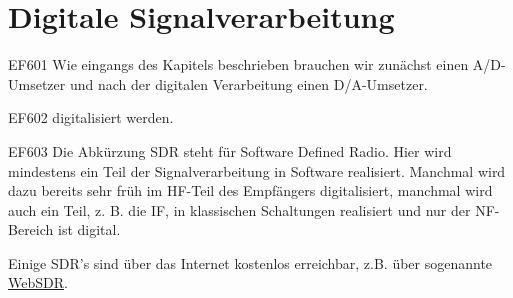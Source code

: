 \setcounter{section}{12}
\section{Digitale Signalverarbeitung}
\setcounter{subsection}{1}

\begin{sol}{EF601}
Wie eingangs des Kapitels beschrieben brauchen wir zunächst einen A/D-Umsetzer und nach der digitalen Verarbeitung einen D/A-Umsetzer.
\end{sol}

\begin{sol}{EF602}
digitalisiert werden.
\end{sol}

\begin{sol}{EF603}
Die Abkürzung SDR steht für Software Defined Radio. Hier wird mindestens ein Teil der Signalverarbeitung in Software realisiert. Manchmal wird dazu bereits sehr früh im HF-Teil des Empfängers digitalisiert, manchmal wird auch ein Teil, z. B. die IF, in klassischen Schaltungen realisiert und nur der NF-Bereich ist digital.

Einige SDR's sind über das Internet kostenlos erreichbar, z.B. über sogenannte \href{http://websdr.org}{WebSDR}.

\end{sol}

